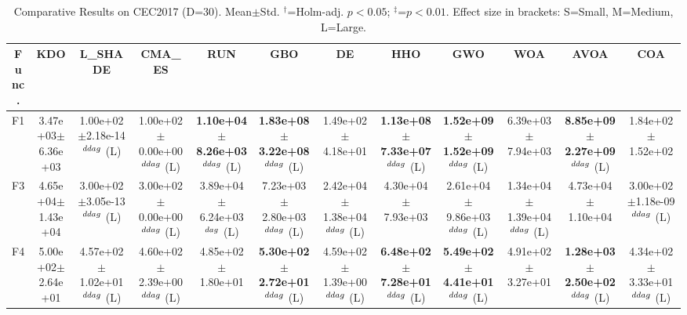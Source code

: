 \begin{table}[!t]
\centering\small
\caption{Comparative Results on CEC2017 (D=30). Mean$\pm$Std. $^{\dag}$=Holm-adj. $p<0.05$; $^{\ddag}$=$p<0.01$. Effect size in brackets: S=Small, M=Medium, L=Large.}
\label{tab:enhanced}
\begin{tabular}{c|ccccccccccc}
\hline
Func. & \textbf{KDO} & L_SHADE & CMA_ES & RUN & GBO & DE & HHO & GWO & WOA & AVOA & COA \\ \hline\hline
F1  & 3.47e+03$\pm$6.36e+03  & 1.00e+02$\pm$2.18e-14$^{\\ddag}$ (L)  & 1.00e+02$\pm$0.00e+00$^{\\ddag}$ (L)  & \textbf{1.10e+04$\pm$8.26e+03}$^{\\ddag}$ (L)  & \textbf{1.83e+08$\pm$3.22e+08}$^{\\ddag}$ (L)  & 1.49e+02$\pm$4.18e+01   & \textbf{1.13e+08$\pm$7.33e+07}$^{\\ddag}$ (L)  & \textbf{1.52e+09$\pm$1.52e+09}$^{\\ddag}$ (L)  & 6.39e+03$\pm$7.94e+03   & \textbf{8.85e+09$\pm$2.27e+09}$^{\\ddag}$ (L)  & 1.84e+02$\pm$1.52e+02  \\ \hline
F3  & 4.65e+04$\pm$1.43e+04  & 3.00e+02$\pm$3.05e-13$^{\\ddag}$ (L)  & 3.00e+02$\pm$0.00e+00$^{\\ddag}$ (L)  & 3.89e+04$\pm$6.24e+03$^{\\dag}$ (L)  & 7.23e+03$\pm$2.80e+03$^{\\ddag}$ (L)  & 2.42e+04$\pm$1.38e+04$^{\\ddag}$ (L)  & 4.30e+04$\pm$7.93e+03   & 2.61e+04$\pm$9.86e+03$^{\\ddag}$ (L)  & 1.34e+04$\pm$1.39e+04$^{\\ddag}$ (L)  & 4.73e+04$\pm$1.10e+04   & 3.00e+02$\pm$1.18e-09$^{\\ddag}$ (L) \\ \hline
F4  & 5.00e+02$\pm$2.64e+01  & 4.57e+02$\pm$1.02e+01$^{\\ddag}$ (L)  & 4.60e+02$\pm$2.39e+00$^{\\ddag}$ (L)  & 4.85e+02$\pm$1.80e+01   & \textbf{5.30e+02$\pm$2.72e+01}$^{\\ddag}$ (L)  & 4.59e+02$\pm$1.39e+00$^{\\ddag}$ (L)  & \textbf{6.48e+02$\pm$7.28e+01}$^{\\ddag}$ (L)  & \textbf{5.49e+02$\pm$4.41e+01}$^{\\ddag}$ (L)  & 4.91e+02$\pm$3.27e+01   & \textbf{1.28e+03$\pm$2.50e+02}$^{\\ddag}$ (L)  & 4.34e+02$\pm$3.33e+01$^{\\ddag}$ (L) \\ \hline

\end{tabular}
\end{table}
